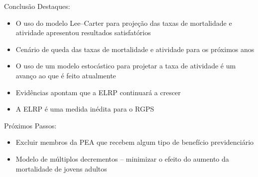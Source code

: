 \documentclass{beamer}
\begin{document}
\begin{frame}{Conclusão}
Destaques:
	\begin{itemize}
		\item{O uso do modelo Lee--Carter para projeção das taxas de mortalidade e atividade apresentou resultados satisfatórios}
		\item{Cenário de queda das taxas de mortalidade e atividade para os próximos anos}
		\item{O uso de um modelo estocástico para projetar a taxa de atividade é um avanço ao que é feito atualmente}
		\item{Evidências apontam que a ELRP continuará a crescer}
		\item{A ELRP é uma medida inédita para o RGPS}
	\end{itemize}
Próximos Passos:
	\begin{itemize}
		\item{Excluir membros da PEA que recebem algum tipo de benefício previdenciário}
		\item{Modelo de múltiplos decrementos -- minimizar o efeito do aumento da mortalidade de jovens adultos}
	\end{itemize}
\end{frame}
\end{document}
